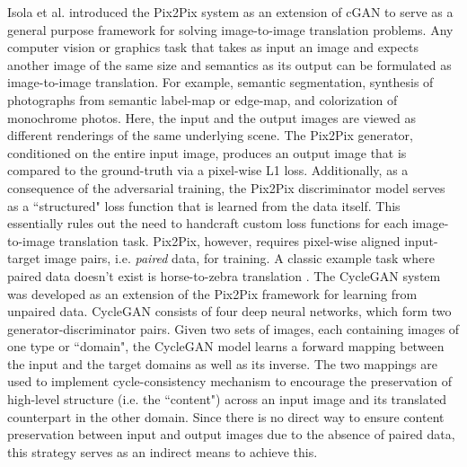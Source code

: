 Isola et al. \cite{isola2017image} introduced the Pix2Pix system as an extension of cGAN to serve as a general purpose framework for solving image-to-image translation problems. Any computer vision or graphics task that takes as input an image and expects another image of the same size and semantics as its output can be formulated as image-to-image translation. For example, semantic segmentation, synthesis of photographs from semantic label-map or edge-map, and colorization of monochrome photos. Here, the input and the output images are viewed as different renderings of the same underlying scene. The Pix2Pix generator, conditioned on the entire input image, produces an output image that is compared to the ground-truth via a pixel-wise L1 loss. Additionally, as a consequence of the adversarial training, the Pix2Pix discriminator model serves as a ``structured" loss function that is learned from the data itself. This essentially rules out the need to handcraft custom loss functions for each image-to-image translation task. Pix2Pix, however, requires pixel-wise aligned input-target image pairs, i.e. \textit{paired} data, for training. A classic example task where paired data doesn't exist is horse-to-zebra translation \cite{zhu2017unpaired}. The CycleGAN system \cite{zhu2017unpaired} was developed as an extension of the Pix2Pix framework for learning from unpaired data. CycleGAN consists of four deep neural networks, which form two generator-discriminator pairs. Given two sets of images, each containing images of one type or ``domain", the CycleGAN model learns a forward mapping between the input and the target domains as well as its inverse. The two mappings are used to implement cycle-consistency mechanism to encourage the preservation of high-level structure (i.e. the ``content") across an input image and its translated counterpart in the other domain. Since there is no direct way to ensure content preservation between input and output images due to the absence of paired data, this strategy serves as an indirect means to achieve this.

